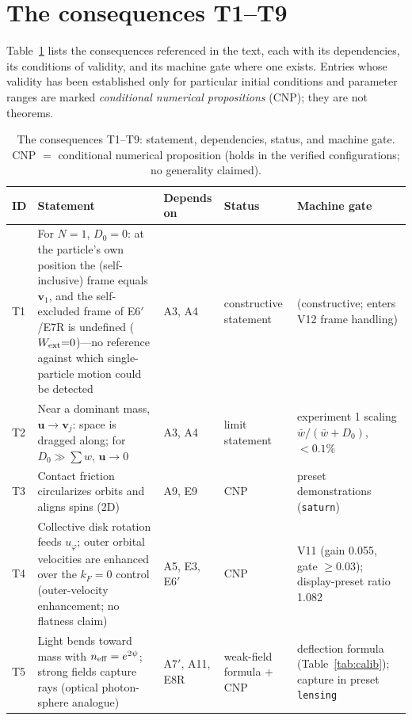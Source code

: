 \documentclass[aps,reprint,amsmath,amssymb,nofootinbib,superscriptaddress,floatfix]{revtex4-2}
\newcommand{\vect}[1]{\bm{#1}}
\newcommand{\Dz}{D_0}
\begin{document}
\section{The consequences T1--T9}
\label{app:theorems}

Table~\ref{tab:theorems} lists the consequences referenced in the
text, each with its dependencies, its conditions of validity, and its
machine gate where one exists.
Entries whose validity has been established only for particular
initial conditions and parameter ranges are marked
\emph{conditional numerical propositions} (CNP); they are not
theorems.

\begin{table}[t]
\caption{\label{tab:theorems}%
The consequences T1--T9: statement, dependencies, status, and machine
gate.
CNP $=$ conditional numerical proposition (holds in the verified
configurations; no generality claimed).}
\begin{ruledtabular}
\begin{tabular}{lp{}p{}p{}p{}}
ID & Statement & Depends on & Status & Machine gate \\
\hline
T1 & For $N{=}1$, $\Dz{=}0$: at the particle's own position the
(self-inclusive) frame equals $\vect{v}_1$, and the self-excluded
frame of E6$'$/E7R is undefined ($W_{\rm ext}{=}0$)---no reference
against which single-particle motion could be detected & A3, A4 &
constructive statement & (constructive; enters V12
frame handling) \\
T2 & Near a dominant mass, $\vect{u} \to \vect{v}_j$: space is
dragged along; for $\Dz \gg \sum w$, $\vect{u} \to 0$ & A3, A4 &
limit statement & experiment 1 scaling
$\bar w/(\bar w{+}\Dz)$, $<0.1\%$ \\
T3 & Contact friction circularizes orbits and aligns spins (2D) &
A9, E9 & CNP & preset demonstrations (\texttt{saturn}) \\
T4 & Collective disk rotation feeds $u_\varphi$; outer orbital
velocities are enhanced over the $k_F{=}0$ control
(outer-velocity enhancement; no flatness claim) & A5, E3, E6$'$ &
CNP & V11 (gain 0.055, gate $\ge$0.03); display-preset ratio 1.082 \\
T5 & Light bends toward mass with $n_{\rm eff} = e^{2\psi}$;
strong fields capture rays (optical photon-sphere analogue) &
A7$'$, A11, E8R & weak-field formula $+$ CNP & deflection formula
(Table~\ref{tab:calib}); capture in preset \texttt{lensing} \\

\end{tabular}
\end{ruledtabular}
\end{table}
\end{document}
